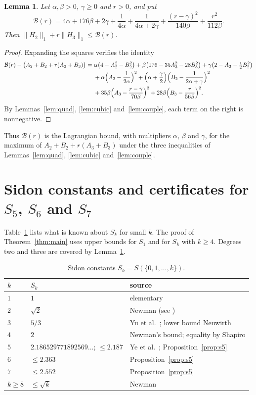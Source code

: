 \documentclass[11pt]{amsart}
\newtheorem{lemma}[theorem]{Lemma}
\theoremstyle{remark}
\numberwithin{equation}{section}
\newcommand{\Bfun}{\mathcal{B}}
\newcommand{\YeVal}{2.186529771892569\ldots}
\newcommand{\FiveOwn}{2.187}
\newcommand{\SixOwn}{2.363}
\newcommand{\SevenOwn}{2.552}
\begin{document}
\begin{lemma}\label{lem:combine}
Let $\alpha,\beta>0$, $\gamma\ge0$ and $r>0$, and put
\[
\Bfun(r)=4\alpha+176\beta+2\gamma+\frac1{4\alpha}+\frac1{4\alpha+2\gamma}+\frac{(r-\gamma)^2}{140\beta}+\frac{r^2}{112\beta}.
\]
Then $\|H_2\|_1+r\|H_3\|_1\le\Bfun(r)$.
\end{lemma}

\begin{proof}
Expanding the squares verifies the identity
\begin{align*}
\Bfun(r)-\bigl(A_2+B_2+r(A_3+B_3)\bigr)={}&\alpha\bigl(4-A_2^2-B_2^2\bigr)+\beta\bigl(176-35A_3^2-28B_3^2\bigr)+\gamma\bigl(2-A_3-\tfrac12B_2^2\bigr)\\
&+\alpha\Bigl(A_2-\frac1{2\alpha}\Bigr)^2+\Bigl(\alpha+\frac\gamma2\Bigr)\Bigl(B_2-\frac1{2\alpha+\gamma}\Bigr)^2\\
&+35\beta\Bigl(A_3-\frac{r-\gamma}{70\beta}\Bigr)^2+28\beta\Bigl(B_3-\frac r{56\beta}\Bigr)^2.
\end{align*}
By Lemmas~\ref{lem:quad}, \ref{lem:cubic} and~\ref{lem:couple}, each term on the right is nonnegative.
\end{proof}

Thus $\Bfun(r)$ is the Lagrangian bound, with multipliers $\alpha$, $\beta$ and $\gamma$, for the maximum of $A_2+B_2+r(A_3+B_3)$ under the three inequalities of Lemmas~\ref{lem:quad}, \ref{lem:cubic} and~\ref{lem:couple}.

\section{Sidon constants and certificates for \texorpdfstring{$S_5$, $S_6$ and $S_7$}{small k}}\label{sec:values}

Table~\ref{tab:sidon} lists what is known about $S_k$ for small $k$.
The proof of Theorem~\ref{thm:main} uses upper bounds for $S_1$ and for $S_k$ with $k\ge4$. Degrees two and three are covered by Lemma~\ref{lem:combine}.

\begin{table}[ht]
\centering
\caption{Sidon constants $S_k=S(\{0,1,\dots,k\})$.}\label{tab:sidon}
\begin{tabular}{@{}lll@{}}
\toprule
$k$ & $S_k$ & source\\
\midrule
$1$ & $1$ & elementary\\
$2$ & $\sqrt2$ & Newman (see \cite{Neu01})\\
$3$ & $5/3$ & Yu et al.\ \cite{Yu26}; lower bound Neuwirth \cite{Neu26}\\
$4$ & $2$ & Newman's bound; equality by Shapiro \cite{Sha51}\\
$5$ & $\YeVal$; $\le\FiveOwn$ & Ye et al.\ \cite{Ye26}; Proposition~\ref{prop:s5}\\
$6$ & $\le\SixOwn$ & Proposition~\ref{prop:s5}\\
$7$ & $\le\SevenOwn$ & Proposition~\ref{prop:s5}\\
$k\ge8$ & $\le\sqrt k$ & Newman \cite[Chapter~3]{Sha51}\\
\bottomrule
\end{tabular}
\end{table}
\end{document}
